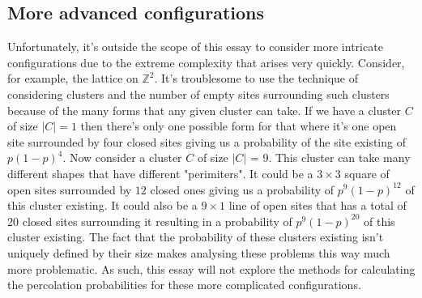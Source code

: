 \subsection{More advanced configurations}
Unfortunately, it's outside the scope of this essay to consider more intricate configurations due to the extreme complexity that arises very quickly. Consider, for example, the
lattice on $\mathbb{Z}^2$. It's troublesome to use the technique of considering clusters and the number of empty sites surrounding such clusters because of the many forms that any
given cluster can take. If we have a cluster $C$ of size $|C| = 1$ then there's only one possible form for that where it's one open site surrounded by four closed sites giving us a
probability of the site existing of $p(1-p)^4$. Now consider a cluster $C$ of size $|C|$ = 9. This cluster can take many different shapes that have different "perimiters". It could
be a $3 \times 3$ square of open sites surrounded by $12$ closed ones giving us a probability of $p^9(1-p)^{12}$ of this cluster existing. It could also be a $9 \times 1$ line of
open sites that has a total of $20$ closed sites surrounding it resulting in a probability of $p^9(1-p)^{20}$ of this cluster existing. The fact that the probability of these
clusters existing isn't uniquely defined by their size makes analysing these problems this way much more problematic. As such, this essay will not explore the methods for
calculating the percolation probabilities for these more complicated configurations.

